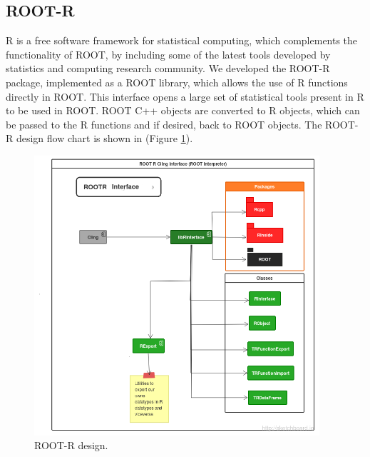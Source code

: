 \documentclass[a4paper]{jpconf}
\begin{document}
\subsection{ROOT-R}
R  is a free software framework for statistical computing\cite{R}, which complements the functionality of ROOT, by including some of the latest tools developed by statistics and computing research community. 
We developed the ROOT-R package, implemented as a ROOT library, which allows the  use of R functions directly in ROOT.
This interface opens a large set of statistical tools present in R to be used in ROOT. ROOT C++ objects are converted to R objects, which can be passed to the  R functions and if desired, back to ROOT objects. 
The ROOT-R design flow chart is shown in (Figure \ref{rootr:label}). 

\begin{figure}[h]
\centering
\includegraphics[width=25pc]{img/rootr.png}\caption{\label{rootr:label} ROOT-R design.}
\end{figure}
\end{document}
